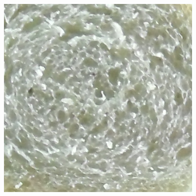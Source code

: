 \documentclass{beamer}
\begin{document}
\begin{frame}
\begin{itemize}
\begin{figure}
\includegraphics[scale=0.2]{../imagenes/camera/b}
\end{figure}


\end{itemize}
\end{frame}
\end{document}
